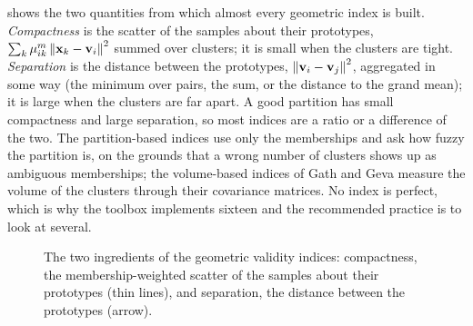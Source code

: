  shows the two quantities from which almost every geometric index is built. \emph{Compactness} is the scatter of the samples about their prototypes, $\sum_k\mu_{ik}^m\left\lVert \mathbf{x}_k-\mathbf{v}_i \right\rVert^2$ summed over clusters; it is small when the clusters are tight. \emph{Separation} is the distance between the prototypes, $\left\lVert \mathbf{v}_i-\mathbf{v}_j \right\rVert^2$, aggregated in some way (the minimum over pairs, the sum, or the distance to the grand mean); it is large when the clusters are far apart. A good partition has small compactness and large separation, so most indices are a ratio or a difference of the two. The partition-based indices use only the memberships and ask how fuzzy the partition is, on the grounds that a wrong number of clusters shows up as ambiguous memberships; the volume-based indices of Gath and Geva measure the volume of the clusters through their covariance matrices. No index is perfect, which is why the toolbox implements sixteen and the recommended practice is to look at several.

\begin{figure}[htbp]\centering
{}
\caption[The two ingredients of the geometric validity indices.]{The two ingredients of the geometric validity indices: compactness, the membership-weighted scatter of the samples about their prototypes (thin lines), and separation, the distance between the prototypes (arrow).}
\label{fig:val:compsep}
\end{figure}

